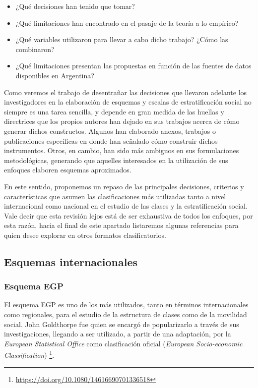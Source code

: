 \documentclass[
]{book}
\providecommand{\tightlist}{%
  \setlength{\itemsep}{0pt}\setlength{\parskip}{0pt}}
\begin{document}
\begin{itemize}
\tightlist
\item
  ¿Qué decisiones han tenido que tomar?
\item
  ¿Qué limitaciones han encontrado en el pasaje de la teoría a lo empírico?
\item
  ¿Qué variables utilizaron para llevar a cabo dicho trabajo? ¿Cómo las combinaron?
\item
  ¿Qué limitaciones presentan las propuestas en función de las fuentes de datos disponibles en Argentina?
\end{itemize}

Como veremos el trabajo de desentrañar las decisiones que llevaron adelante los investigadores en la elaboración de esquemas y escalas de estratificación social no siempre es una tarea sencilla, y depende en gran medida de las huellas y directrices que los propios autores han dejado en sus trabajos acerca de cómo generar dichos constructos. Algunos han elaborado anexos, trabajos o publicaciones específicas en donde han señalado cómo construir dichos instrumentos. Otros, en cambio, han sido más ambiguos en sus formulaciones metodológicas, generando que aquelles interesados en la utilización de sus enfoques elaboren esquemas aproximados.

En este sentido, proponemos un repaso de las principales decisiones, criterios y características que asumen las clasificaciones más utilizadas tanto a nivel internacional como nacional en el estudio de las clases y la estratificación social. Vale decir que esta revisión lejos está de ser exhaustiva de todos los enfoques, por esta razón, hacia el final de este apartado listaremos algunas referencias para quien desee explorar en otros formatos clasificatorios.

\hypertarget{esquemas-internacionales}{%
\subsection{Esquemas internacionales}\label{esquemas-internacionales}}

\hypertarget{esquema-egp}{%
\subsubsection{Esquema EGP}\label{esquema-egp}}

El esquema EGP \citep{Erikson.etal1979} es uno de los más utilizados, tanto en términos internacionales como regionales, para el estudio de la estructura de clases como de la movilidad social. John Goldthorpe fue quien se encargó de popularizarlo a través de sus investigaciones, llegando a ser utilizado, a partir de una adaptación, por la \emph{European Statistical Office} como clasificación oficial (\emph{European Socio-economic Classification}) \footnote{\url{https://doi.org/10.1080/14616690701336518}}.
\end{document}

